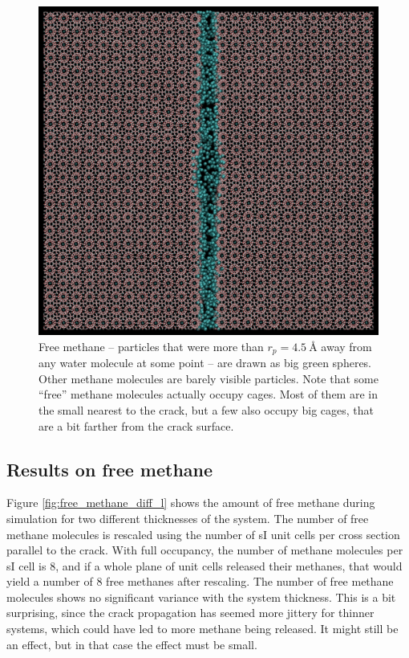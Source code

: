 \begin{figure}
\centering
\includegraphics[width=\textwidth]{../pictures/free_methane.pdf}
\caption{Free methane -- particles that were more than $r_p = \SI{4.5}{\angstrom}$ away from any water molecule at some point -- are drawn as big green spheres. Other methane molecules are barely visible particles. Note that some ``free'' methane molecules actually occupy cages. Most of them are in the small nearest to the crack, but a few also occupy big cages, that are a bit farther from the crack surface. }
\label{fig:free_methane}
\end{figure}


\subsection{Results on free methane}
Figure \ref{fig:free_methane_diff_l} shows the amount of free methane during simulation for two different thicknesses of the system. The number of free methane molecules is rescaled using the number of sI unit cells per cross section parallel to the crack. With full occupancy, the number of methane molecules per sI cell is 8, and if a whole plane of unit cells released their methanes, that would yield a number of 8 free methanes after rescaling. The number of free methane molecules shows no significant variance with the system thickness. This is a bit surprising, since the crack propagation has seemed more jittery for thinner systems, which could have led to more methane being released. It might still be an effect, but in that case the effect must be small. 

